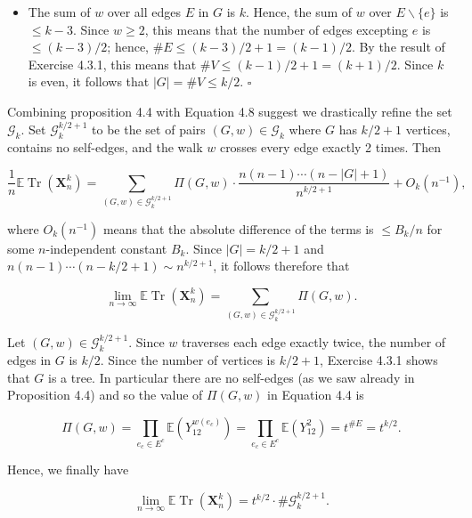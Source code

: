 \documentclass[10pt]{article}
\begin{document}
\begin{itemize}
  \item[(b)] The sum of $w$ over all edges $E$ in $G$ is $k$. Hence, the sum of $w$ over $E \backslash\{e\}$ is $\leq k-3$. Since $w \geq 2$, this means that the number of edges excepting $e$ is $\leq(k-3) / 2$; hence, $\# E \leq(k-3) / 2+1=(k-1) / 2$. By the result of Exercise 4.3.1, this means that $\# V \leq(k-1) / 2+1=(k+1) / 2$. Since $k$ is even, it follows that $|G|=\# V \leq k / 2$. \(\square\)
\end{itemize}

Combining proposition 4.4 with Equation 4.8 suggest we drastically refine the set $\mathcal{G}_{k}$. Set $\mathcal{G}_{k}^{k / 2+1}$ to be the set of pairs $(G, w) \in \mathcal{G}_{k}$ where $G$ has $k / 2+1$ vertices, contains no self-edges, and the walk $w$ crosses every edge exactly 2 times. Then


\begin{equation*}
\frac{1}{n} \mathbb{E} \operatorname{Tr}\left(\mathbf{X}_{n}^{k}\right)=\sum_{(G, w) \in \mathcal{G}_{k}^{k / 2+1}} \Pi(G, w) \cdot \frac{n(n-1) \cdots(n-|G|+1)}{n^{k / 2+1}}+O_{k}\left(n^{-1}\right), \tag{4.9}
\end{equation*}


where $O_{k}\left(n^{-1}\right)$ means that the absolute difference of the terms is $\leq B_{k} / n$ for some $n$-independent constant $B_{k}$. Since $|G|=k / 2+1$ and $n(n-1) \cdots(n-k / 2+1) \sim n^{k / 2+1}$, it follows therefore that

$$
\lim _{n \rightarrow \infty} \mathbb{E} \operatorname{Tr}\left(\mathbf{X}_{n}^{k}\right)=\sum_{(G, w) \in \mathcal{G}_{k}^{k / 2+1}} \Pi(G, w) .
$$

Let $(G, w) \in \mathcal{G}_{k}^{k / 2+1}$. Since $w$ traverses each edge exactly twice, the number of edges in $G$ is $k / 2$. Since the number of vertices is $k / 2+1$, Exercise 4.3.1 shows that $G$ is a tree. In particular there are no self-edges (as we saw already in Proposition 4.4) and so the value of $\Pi(G, w)$ in Equation 4.4 is


\begin{equation*}
\Pi(G, w)=\prod_{e_{c} \in E^{c}} \mathbb{E}\left(Y_{12}^{w\left(e_{c}\right)}\right)=\prod_{e_{c} \in E^{c}} \mathbb{E}\left(Y_{12}^{2}\right)=t^{\# E}=t^{k / 2} . \tag{4.10}
\end{equation*}


Hence, we finally have


\begin{equation*}
\lim _{n \rightarrow \infty} \mathbb{E} \operatorname{Tr}\left(\mathbf{X}_{n}^{k}\right)=t^{k / 2} \cdot \# \mathcal{G}_{k}^{k / 2+1} . \tag{4.11}
\end{equation*}
\end{document}
